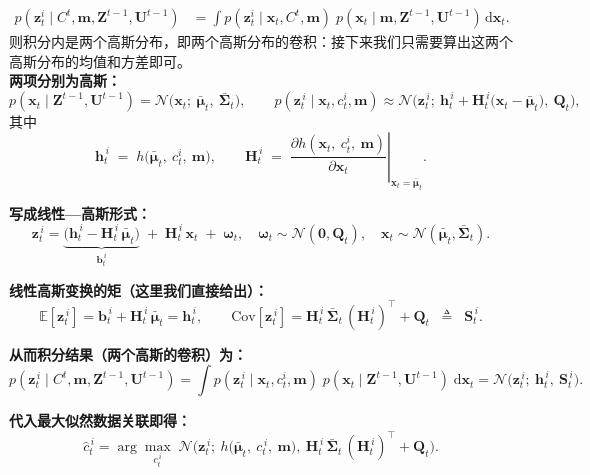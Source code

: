 \documentclass[../main.tex]{subfiles}
\begin{document}
\begin{enumerate}
\begin{itemize}
{{        \begin{align}
        p(\mathbf{z}_t^i \mid C^t,\mathbf{m},\mathbf{Z}^{t-1},\mathbf{U}^{t-1})
        &= \int p(\mathbf{z}_t^i \mid \mathbf{x}_t,C^t,\mathbf{m})\; p(\mathbf{x}_t \mid \mathbf{m},\mathbf{Z}^{t-1},\mathbf{U}^{t-1})\,\mathrm{d}\mathbf{x}_t .
        \end{align}
        则积分内是两个高斯分布，即两个高斯分布的卷积：接下来我们只需要算出这两个高斯分布的均值和方差即可。\\
        \noindent\textbf{两项分别为高斯：}
\[
p(\mathbf{x}_t \mid \mathbf{Z}^{t-1},\mathbf{U}^{t-1})
=\mathcal{N}\!\big(\mathbf{x}_t;\ \bar{\boldsymbol{\mu}}_t,\ \bar{\boldsymbol{\Sigma}}_t\big),
\qquad
p(\mathbf{z}_t^{\,i}\mid \mathbf{x}_t,c_t^i,\mathbf{m})
\approx \mathcal{N}\!\Big(\mathbf{z}_t^{\,i};\ \mathbf{h}_t^{\,i} + \mathbf{H}_t^{\,i}\!\big(\mathbf{x}_t-\bar{\boldsymbol{\mu}}_t\big),\ \mathbf{Q}_t\Big),
\]
其中
\[
\mathbf{h}_t^{\,i} \;=\; h\!\big(\bar{\boldsymbol{\mu}}_t,\ c_t^i,\ \mathbf{m}\big), 
\qquad 
\mathbf{H}_t^{\,i} \;=\; \left.\dfrac{\partial h(\mathbf{x}_t,\ c_t^i,\ \mathbf{m})}{\partial \mathbf{x}_t}\right|_{\mathbf{x}_t=\bar{\boldsymbol{\mu}}_t}.
\]

\noindent\textbf{写成线性—高斯形式：}
\[
\mathbf{z}_t^{\,i}
= \underbrace{\big(\mathbf{h}_t^{\,i} - \mathbf{H}_t^{\,i}\,\bar{\boldsymbol{\mu}}_t\big)}_{\displaystyle \mathbf{b}_t^{\,i}}
\;+\; \mathbf{H}_t^{\,i}\,\mathbf{x}_t \;+\; \boldsymbol{\omega}_t,
\quad \boldsymbol{\omega}_t \sim \mathcal{N}(\mathbf{0},\mathbf{Q}_t),\quad
\mathbf{x}_t \sim \mathcal{N}(\bar{\boldsymbol{\mu}}_t,\bar{\boldsymbol{\Sigma}}_t).
\]

\noindent\textbf{线性高斯变换的矩（这里我们直接给出）：}
\[
\mathbb{E}[\mathbf{z}_t^{\,i}]
= \mathbf{b}_t^{\,i} + \mathbf{H}_t^{\,i}\,\bar{\boldsymbol{\mu}}_t
= \mathbf{h}_t^{\,i},
\qquad
\mathrm{Cov}[\mathbf{z}_t^{\,i}]
= \mathbf{H}_t^{\,i}\,\bar{\boldsymbol{\Sigma}}_t\,(\mathbf{H}_t^{\,i})^\top + \mathbf{Q}_t
\;\; \triangleq\;\; \mathbf{S}_t^{\,i}.
\]

\noindent\textbf{从而积分结果（两个高斯的卷积）为：}
\[
p(\mathbf{z}_t^{\,i} \mid C^t,\mathbf{m},\mathbf{Z}^{t-1},\mathbf{U}^{t-1})
= \int p(\mathbf{z}_t^{\,i}\mid \mathbf{x}_t,c_t^i,\mathbf{m})\;
        p(\mathbf{x}_t\mid \mathbf{Z}^{t-1},\mathbf{U}^{t-1})\; \mathrm{d}\mathbf{x}_t
= \mathcal{N}\!\big(\mathbf{z}_t^{\,i};\ \mathbf{h}_t^{\,i},\ \mathbf{S}_t^{\,i}\big).
\]

\noindent\textbf{代入最大似然数据关联即得：}
\[
\hat{c}_t^{\,i}
= \arg\max_{c_t^{\,i}}
\; \mathcal{N}\!\Big(
\mathbf{z}_t^{\,i};\ h\!\big(\bar{\boldsymbol{\mu}}_t,\ c_t^{\,i},\ \mathbf{m}\big),
\ \mathbf{H}_t^{\,i}\,\bar{\boldsymbol{\Sigma}}_t\,(\mathbf{H}_t^{\,i})^\top + \mathbf{Q}_t
\Big).
\]
    
    
        }}

    \end{itemize}
    
    
\end{enumerate}
\end{document}
